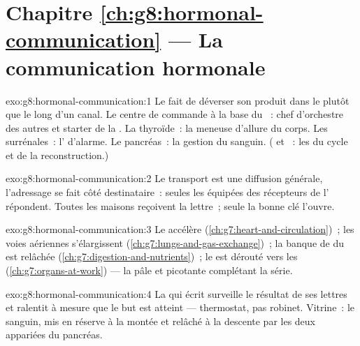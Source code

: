 \section*{Chapitre \ref{ch:g8:hormonal-communication} --- La communication hormonale}

\begin{solution}{exo:g8:hormonal-communication:1}
Le fait de déverser son produit dans le  plutôt que le
long d'un canal. Le centre de commande à la base du ~:
chef d'orchestre des autres et starter de la . La
thyroïde~: la meneuse d'allure du corps. Les surrénales~:
l' d'alarme. Le pancréas~: la gestion du 
sanguin. ( et ~: les  du cycle et
de la reconstruction.)
\end{solution}

\begin{solution}{exo:g8:hormonal-communication:2}
Le transport est une diffusion générale, l'adressage se fait
côté destinataire~: seules les  équipées des
récepteurs de l' répondent. Toutes les maisons
reçoivent la lettre~; seule la bonne clé l'ouvre.
\end{solution}

\begin{solution}{exo:g8:hormonal-communication:3}
Le  accélère (\cref{ch:g7:heart-and-circulation})~; les
voies aériennes s'élargissent
(\cref{ch:g7:lungs-and-gas-exchange})~; la banque de 
du  est relâchée
(\cref{ch:g7:digestion-and-nutrients})~; le  est dérouté
vers les  (\cref{ch:g7:organs-at-work}) --- la 
pâle et picotante complétant la série.
\end{solution}

\begin{solution}{exo:g8:hormonal-communication:4}
La  qui écrit surveille le résultat de ses lettres et
ralentit à mesure que le but est atteint --- thermostat, pas
robinet. Vitrine~: le  sanguin, mis en réserve à la
montée et relâché à la descente par les deux 
appariées du pancréas.
\end{solution}

